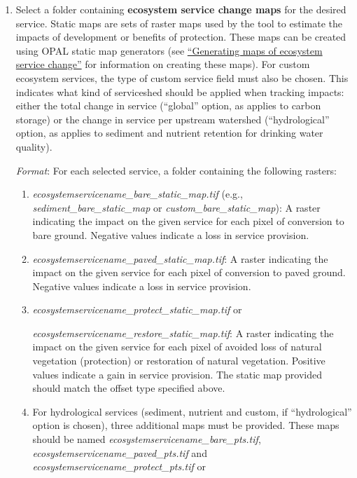 \documentclass[11pt,letterpaper]{report}
\newenvironment{myenumerate}{%
	\edef\backupindent{\the\parindent}
	\enumerate
	\setlength{\parindent}{\backupindent}
		\setlist[enumerate,1]{label=(\arabic*)}
		\setlist[enumerate,2]{label=(\arabic*)}
}{\endenumerate}
\begin{document}
\begin{myenumerate}
\begin{enumerate}[label=\alph*.]
				\item Select a folder containing \textbf{ecosystem service change maps} for the desired service. Static maps are sets of raster maps used by the tool to estimate the impacts of development or benefits of protection. These maps can be created using OPAL static map generators (see \hyperref[ch:maps]{``Generating maps of ecosystem service change''} for information on creating these maps). For custom ecosystem services, the type of custom service field must also be chosen. This indicates what kind of serviceshed should be applied when tracking impacts: either the total change in service (``global'' option, as applies to carbon storage) or the change in service per upstream watershed (``hydrological'' option, as applies to sediment and nutrient retention for drinking water quality).\\
				
				\begin{adjustwidth}{0.25in}{}
					{\em Format}: For each selected service, a folder containing the following rasters:
				\end{adjustwidth}
				
				\begin{enumerate}[label=(\arabic*),leftmargin=0.5in,labelindent=!,itemindent=-0.02in]
					\item {\em ecosystemservicename\_{}bare\_{}static\_{}map.tif} (e.g., {\em sediment\_{}bare\_{}static\_{}map} or {\em custom\_{}bare\_{}static\_{}map}): A raster indicating the impact on the given service for each pixel of conversion to bare ground. Negative values indicate a loss in service provision.
					
					\item {\em ecosystemservicename\_{}paved\_{}static\_{}map.tif}: A raster indicating the impact on the given service for each pixel of conversion to paved ground. Negative values indicate a loss in service provision.
					
					\item {\em ecosystemservicename\_{}protect\_{}static\_{}map.tif} or
					
					 {\em ecosystemservicename\_{}restore\_{}static\_{}map.tif}: A raster indicating the impact on the given service for each pixel of avoided loss of natural vegetation (protection) or restoration of natural vegetation. Positive values indicate a gain in service provision. The static map provided should match the offset type specified above. 
					
					\item For hydrological services (sediment, nutrient and custom, if ``hydrological'' option is chosen), three additional maps must be provided. These maps should be named {\em ecosystemservicename\_{}bare\_{}pts.tif}, {\em ecosystemservicename\_{}paved\_{}pts.tif} and {\em ecosystemservicename\_{}protect\_{}pts.tif} or 
					

\end{enumerate}
\end{enumerate}
\end{myenumerate}
\end{document}

